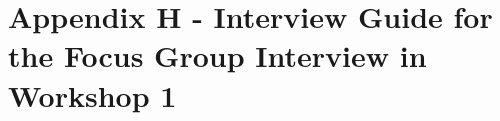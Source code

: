 \section*{Appendix H - Interview Guide for the Focus Group Interview in Workshop 1}
\label{app:interviewGuide}
\begin{figure}[H] 
\end{figure}  

\newpage
